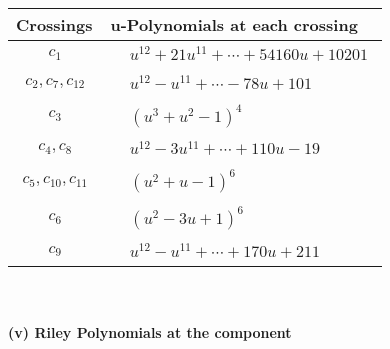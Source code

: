 \documentclass[1p]{elsarticle_modified}
\theoremstyle{definition}
\begin{document}
\begin{tabular}{m{50pt}|m{274pt}}
Crossings & \hspace{64pt}u-Polynomials at each crossing \\
\hline $$\begin{aligned}c_{1}\end{aligned}$$&$\begin{aligned}
&u^{12}+21 u^{11}+\cdots+54160 u+10201
\end{aligned}$\\
\hline $$\begin{aligned}c_{2},c_{7},c_{12}\end{aligned}$$&$\begin{aligned}
&u^{12}- u^{11}+\cdots-78 u+101
\end{aligned}$\\
\hline $$\begin{aligned}c_{3}\end{aligned}$$&$\begin{aligned}
&(u^3+u^2-1)^4
\end{aligned}$\\
\hline $$\begin{aligned}c_{4},c_{8}\end{aligned}$$&$\begin{aligned}
&u^{12}-3 u^{11}+\cdots+110 u-19
\end{aligned}$\\
\hline $$\begin{aligned}c_{5},c_{10},c_{11}\end{aligned}$$&$\begin{aligned}
&(u^2+u-1)^6
\end{aligned}$\\
\hline $$\begin{aligned}c_{6}\end{aligned}$$&$\begin{aligned}
&(u^2-3 u+1)^6
\end{aligned}$\\
\hline $$\begin{aligned}c_{9}\end{aligned}$$&$\begin{aligned}
&u^{12}- u^{11}+\cdots+170 u+211
\end{aligned}$\\
\hline
\end{tabular}\\~\\
\newpage\renewcommand{\arraystretch}{1}
\flushleft \textbf{(v) Riley Polynomials at the component}\newline \\
\end{document}
